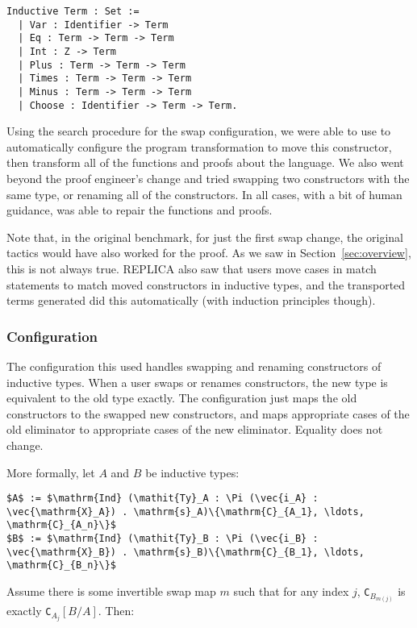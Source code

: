 \begin{lstlisting}
Inductive Term : Set :=
  | Var : Identifier -> Term
  | Eq : Term -> Term -> Term
  | Int : Z -> Term
  | Plus : Term -> Term -> Term
  | Times : Term -> Term -> Term
  | Minus : Term -> Term -> Term
  | Choose : Identifier -> Term -> Term.
\end{lstlisting}

Using the search procedure for the swap configuration, we were able to use \toolname
to automatically configure the program transformation to move this constructor,
then transform all of the functions and proofs about the language.
We also went beyond the proof engineer's change and tried swapping two constructors with the same type,
or renaming all of the constructors.
In all cases, with a bit of human guidance, \toolname was able to repair the functions and proofs.

Note that, in the original benchmark, for just the first swap change,
the original tactics would have also worked for the proof. 
As we saw in Section~\ref{sec:overview}, this is not always true.
REPLICA also saw that users move cases in match statements to match moved constructors
in inductive types, and the transported terms \toolname generated did this automatically
(with induction principles though).

\subsubsection{Configuration}
The configuration this used handles swapping and renaming constructors of inductive types.
When a user swaps or renames constructors, the new type is equivalent to the old type exactly.
The configuration just maps the old constructors to the swapped new constructors, and maps appropriate
cases of the old eliminator to appropriate cases of the new eliminator.
Equality does not change.

More formally, let $A$ and $B$ be inductive types:

\begin{lstlisting}
$A$ := $\mathrm{Ind} (\mathit{Ty}_A : \Pi (\vec{i_A} : \vec{\mathrm{X}_A}) . \mathrm{s}_A)\{\mathrm{C}_{A_1}, \ldots, \mathrm{C}_{A_n}\}$
$B$ := $\mathrm{Ind} (\mathit{Ty}_B : \Pi (\vec{i_B} : \vec{\mathrm{X}_B}) . \mathrm{s}_B)\{\mathrm{C}_{B_1}, \ldots, \mathrm{C}_{B_n}\}$
\end{lstlisting}		
Assume there is some invertible swap map $m$ such that for any index $j$,
\lstinline{C}$_{B_{m(j)}}$ is exactly \lstinline{C}$_{A_j}[B / A]$.
Then:

